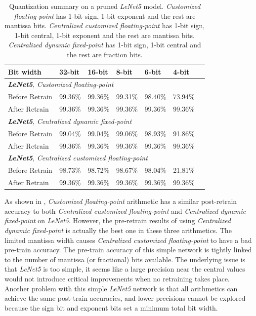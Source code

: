 \documentclass[a4paper,12pt]{report}
\begin{document}
\begin{table}[!h]
  \centering
  \begin{tabular}{lllllll}
    \hline
    \hline
    Bit width               &32-bit     &16-bit       &8-bit       &6-bit     &4-bit\\
    \hline
    \hline
    \multicolumn{5}{l}{\textbf{\textit{LeNet5}}, \textit{Customized floating-point}}\\
    \hline
    Before Retrain          &99.36\%    &99.36\%      &99.31\%     &98.40\%   &73.94\%\\
    After Retrain           &99.36\%    &99.36\%      &99.36\%     &99.36\%   &99.36\%\\
    \hline
    \hline
    \multicolumn{5}{l}{\textbf{\textit{LeNet5}}, \textit{Centralized dynamic fixed-point}}\\
    \hline
    Before Retrain          &99.04\%    &99.04\%    &99.06\%     &98.93\%   &91.86\%\\
    After Retrain           &99.36\%    &99.36\%    &99.36\%     &99.36\%   &99.36\%\\
    \hline
    \hline
    \multicolumn{5}{l}{\textbf{\textit{LeNet5}}, \textit{Centralized customized floating-point}}\\
    \hline
    Before Retrain          &98.73\%    &98.72\%    &98.67\%     &98.04\%   &21.81\%\\
    After Retrain           &99.36\%    &99.36\%    &99.36\%     &99.36\%   &99.36\%\\
    \hline
    \hline
  \end{tabular}
  \caption{Quantization summary on a pruned \textit{LeNet5} model. \textit{Customized
  floating-point} has 1-bit sign, 1-bit exponent and the rest are mantissa bits.
  \textit{Centralized customized floating-point} has 1-bit sign, 1-bit central,
  1-bit exponent and the rest are mantissa bits.
  \textit{Centralized dynamic fixed-point} has
  1-bit sign, 1-bit central and the rest are fraction bits.}
  \label{tab:pruned_quan1}
\end{table}

As shown in , \textit{Customized floating-point} arithmetic
has a similar post-retrain accuracy to both \textit{Centralized customized floating-point}
and \textit{Centralized dynamic fixed-point} on \textit{LeNet5}.
However, the pre-retrain results of using \textit{Centralized dynamic fixed-point}
is actually the best one in these three arithmetics.
The limited mantissa width causes \textit{Centralized customized floating-point} to
have a bad pre-train accuracy.
The pre-train accuracy of this simple network is tightly linked to the number of
mantissa (or fractional) bits available.
The underlying issue is that \textit{LeNet5} is too simple, it seems
like a large precision near the central values would not introduce critical
improvements when no retraining takes place.
Another problem with this simple \textit{LeNet5} network is that all
arithmetics can achieve the same post-train accuracies, and lower precisions
cannot be explored because the sign bit and exponent bits set a minimum total bit width.
\end{document}
